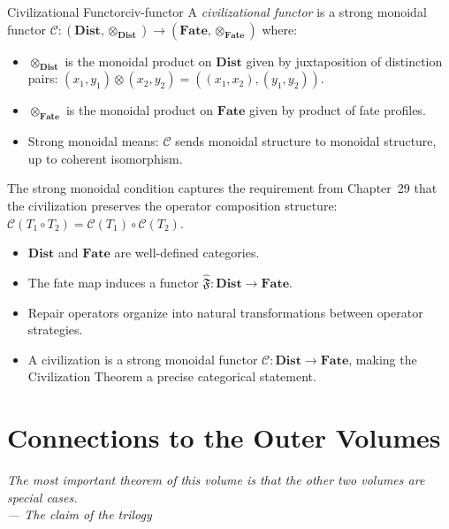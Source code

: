 \documentclass[12pt,twoside,openright]{book}
\newcommand{\fateMap}{\mathfrak{F}}
\newcommand{\catDist}{\mathbf{Dist}}
\newcommand{\catFate}{\mathbf{Fate}}
\newcommand{\civFunc}{\mathcal{C}}
\newenvironment{epigraph}[2]{%
  \vspace{1em}\begin{flushright}
  \begin{minipage}{0.72\textwidth}
  \itshape\small #1\\[0.4em]
  \upshape\footnotesize\sffamily\color{DistGray}--- #2
  \end{minipage}\end{flushright}\vspace{1.5em}}{}
\providecommand{\catDist}{\mathbf{Dist}}
\providecommand{\catFate}{\mathbf{Fate}}
\providecommand{\civFunc}{\mathcal{C}}
\newenvironment{appsummary}{%
  \begin{tcolorbox}[colback=DistBlue!5,colframe=DistBlue,
    title={\faBookOpen\enspace Appendix Summary},
    fonttitle=\sffamily\bfseries\color{white},
    attach boxed title to top left={yshift=-2mm,xshift=4mm},
    boxed title style={colback=DistBlue,rounded corners}]
  \begin{itemize}[nosep,leftmargin=*]}{%
  \end{itemize}\end{tcolorbox}}
\begin{document}
\begin{definition}{Civilizational Functor}{civ-functor}
A \emph{civilizational functor} is a strong monoidal functor
$\civFunc:(\catDist,\otimes_{\catDist})\to
(\catFate,\otimes_{\catFate})$ where:
\begin{itemize}[nosep,leftmargin=2em]
  \item $\otimes_{\catDist}$ is the monoidal product on
    $\catDist$ given by juxtaposition of distinction pairs:
    $(x_1,y_1)\otimes(x_2,y_2)=((x_1,x_2),(y_1,y_2))$.
  \item $\otimes_{\catFate}$ is the monoidal product on
    $\catFate$ given by product of fate profiles.
  \item Strong monoidal means: $\civFunc$ sends monoidal
    structure to monoidal structure, up to coherent
    isomorphism.
\end{itemize}
\end{definition}

The strong monoidal condition captures the requirement from
Chapter~29 that the civilization preserves the operator
composition structure: $\civFunc(T_1\circ T_2)=\civFunc(T_1)
\circ\civFunc(T_2)$.

\begin{appsummary}
\item $\catDist$ and $\catFate$ are well-defined categories.
\item The fate map induces a functor $\hat{\fateMap}:
  \catDist\to\catFate$.
\item Repair operators organize into natural transformations
  between operator strategies.
\item A civilization is a strong monoidal functor
  $\civFunc:\catDist\to\catFate$, making the Civilization
  Theorem a precise categorical statement.
\end{appsummary}


\chapter{Connections to the Outer Volumes}
\label{app:connections}

\begin{epigraph}{The most important theorem of this volume
  is that the other two volumes are special cases.}%
  {The claim of the trilogy}
\end{epigraph}
\end{document}
